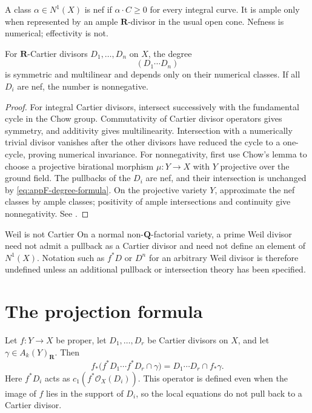 A class \(\alpha\in N^1(X)\) is nef if
\(\alpha\cdot C\geq0\) for every integral curve.
It is ample only when represented by an ample \(\mathbf R\)-divisor in the
usual open cone.
Nefness is numerical; effectivity is not.

\begin{proposition}\label{prop:appF-mixed-cartier}
For \(\mathbf R\)-Cartier divisors \(D_1,\ldots,D_n\) on \(X\), the degree
\[
                              (D_1\cdots D_n)
\tag{F.2}\label{eq:appF-mixed-intersection}
\]
is symmetric and multilinear and depends only on their numerical classes.
If all \(D_i\) are nef, the number is nonnegative.
\end{proposition}

\begin{proof}
For integral Cartier divisors, intersect successively with the fundamental
cycle in the Chow group.
Commutativity of Cartier divisor operators gives symmetry, and additivity
gives multilinearity.
Intersection with a numerically trivial divisor vanishes after the other
divisors have reduced the cycle to a one-cycle, proving numerical
invariance.
For nonnegativity, first use Chow's lemma to choose a projective
birational morphism \(\mu:Y\to X\) with \(Y\) projective over the ground
field.  The pullbacks of the \(D_i\) are nef, and their intersection is
unchanged by \eqref{eq:appF-degree-formula}.  On the projective variety
\(Y\), approximate the nef classes by ample classes; positivity of ample
intersections and continuity give nonnegativity.
See \cite[Chapters~1 and~19]{Ful}.
\end{proof}

\begin{warning}{Weil is not Cartier}
\label{warn:appF-weil-not-cartier}
On a normal non-\(\mathbf Q\)-factorial variety, a prime Weil divisor need
not admit a pullback as a Cartier divisor and need not define an element of
\(N^1(X)\).
Notation such as \(f^*D\) or \(D^n\) for an arbitrary Weil divisor is
therefore undefined unless an additional pullback or intersection theory has
been specified.
\end{warning}

\section{The projection formula}
\label{sec:appF-projection}

\begin{theorem}\label{thm:appF-projection}
Let \(f:Y\to X\) be proper, let \(D_1,\ldots,D_r\) be Cartier divisors on
\(X\), and let \(\gamma\in A_k(Y)_{\mathbf R}\).
Then
\[
 f_*\bigl(
 f^*D_1\cdots f^*D_r\cap\gamma
 \bigr)
 =
 D_1\cdots D_r\cap f_*\gamma.
\tag{F.3}\label{eq:appF-projection}
\]
Here \(f^*D_i\) acts as \(c_1(f^*\mathcal O_X(D_i))\).
This operator is defined even when the image of \(f\) lies in the
support of \(D_i\), so the local equations do not pull back to a
Cartier divisor.
\end{theorem}

